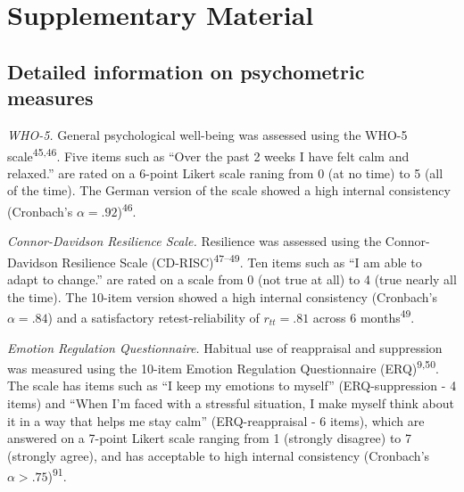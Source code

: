 \documentclass[
  man,floatsintext]{apa6}
\begin{document}


\newpage

\hypertarget{SupplementaryMaterial}{%
\section{Supplementary Material}\label{SupplementaryMaterial}}


\setcounter{section}{19}
\setcounter{figure}{0}
\setcounter{table}{1}
\newpage

\hypertarget{SupplementQuestionnaires}{%
\subsection{Detailed information on psychometric measures}\label{SupplementQuestionnaires}}

\emph{WHO-5.} General psychological well-being was assessed using the WHO-5 scale\textsuperscript{45,46}.
Five items such as ``Over the past 2 weeks I have felt calm and relaxed.'' are rated on a 6-point Likert scale raning from 0 (at no time) to 5 (all of the time).
The German version of the scale showed a high internal consistency (Cronbach's \(\alpha=.92\))\textsuperscript{46}.

\emph{Connor-Davidson Resilience Scale.} Resilience was assessed using the Connor-Davidson Resilience Scale (CD-RISC)\textsuperscript{47--49}.
Ten items such as ``I am able to adapt to change.'' are rated on a scale from 0 (not true at all) to 4 (true nearly all the time).
The 10-item version showed a high internal consistency (Cronbach's \(\alpha=.84\)) and a satisfactory retest-reliability of \(r_{tt}=.81\) across 6 months\textsuperscript{49}.

\emph{Emotion Regulation Questionnaire.} Habitual use of reappraisal and suppression was measured using the 10-item Emotion Regulation Questionnaire (ERQ)\textsuperscript{9,50}.
The scale has items such as ``I keep my emotions to myself'' (ERQ-suppression - 4 items) and ``When I'm faced with a stressful situation, I make myself think about it in a way that helps me stay calm'' (ERQ-reappraisal - 6 items), which are answered on a 7-point Likert scale ranging from 1 (strongly disagree) to 7 (strongly agree), and has acceptable to high internal consistency (Cronbach's \(\alpha>.75\))\textsuperscript{91}.
\end{document}
